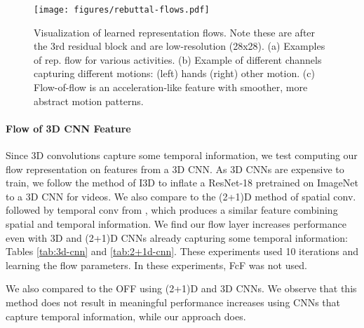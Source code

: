 \documentclass[10pt,twocolumn,letterpaper]{article}
\begin{document}
\begin{figure}
    \centering
    \texttt{[image: figures/rebuttal-flows.pdf]}
    \caption{Visualization of learned representation flows. Note these are after the 3rd residual block and are low-resolution (28x28). (a) Examples of rep. flow for various activities. (b) Example of different channels capturing different motions: (left) hands (right) other motion. (c) Flow-of-flow is an acceleration-like feature with smoother, more abstract motion patterns. }
    \label{fig:vis-flow}
    \vspace{-10pt}
\end{figure}




\vspace{-3pt}
\paragraph{Flow of 3D CNN Feature} Since 3D convolutions capture some temporal information, we test computing our flow representation on features from a 3D CNN. As 3D CNNs are expensive to train, we follow the method of I3D \cite{carreira2017quo} to inflate a ResNet-18 pretrained on ImageNet to a 3D CNN for videos. We also compare to the (2+1)D method of spatial conv. followed by temporal conv from \cite{xie2017rethinking}, which produces a similar feature combining spatial and temporal information. We find our flow layer increases performance even with 3D and (2+1)D CNNs already capturing some temporal information: Tables \ref{tab:3d-cnn} and \ref{tab:2+1d-cnn}. These experiments used 10 iterations and learning the flow parameters. In these experiments, FcF was not used.

We also compared to the OFF \cite{sun2018optical} using (2+1)D and 3D CNNs. We observe that this method does not result in meaningful performance increases using CNNs that capture temporal information, while our approach does.
\end{document}
